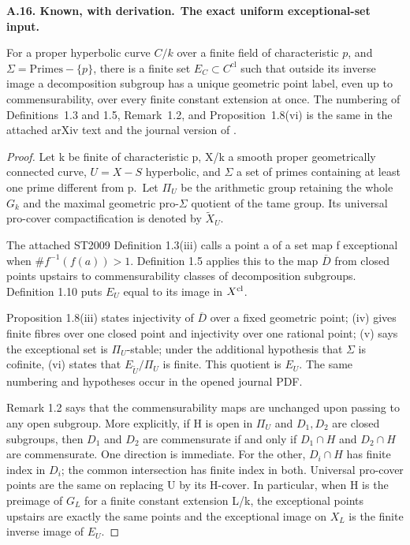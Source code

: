 \documentclass[11pt,a4paper]{article}
\newcommand{\cl}{\mathrm{cl}}
\newenvironment{claim}[3]{\par\medskip\noindent\hypertarget{#1}{\textbf{#1. #2.}}\ \textbf{#3.}\par\nopagebreak\smallskip\begingroup\itshape}{\endgroup\par\smallskip}
\begin{document}
\begin{claim}{A.16}{Known, with derivation}{The exact uniform exceptional-set input}

For a proper hyperbolic curve $C/k$ over a finite field of
characteristic $p$, and $\Sigma=\mathrm{Primes}-\{p\}$, there is a
finite set $E_C\subset C^{\cl}$ such that outside its inverse image
a decomposition subgroup has a unique geometric point label, even
up to commensurability, over every finite constant extension at once.
The numbering of Definitions~1.3 and 1.5, Remark~1.2, and
Proposition~1.8(vi) is the same in the attached arXiv text and the
journal version of \cite{LA_ST2009}.

\end{claim}

\begin{proof}

Let k be finite of characteristic p, X/k a smooth proper geometrically connected curve, \(U=X-S\) hyperbolic, and \({\Sigma}\) a set of primes containing at least one prime different from p.~Let \({\Pi}_U\) be the arithmetic group retaining the whole \(G_k\) and the maximal geometric pro-\({\Sigma}\) quotient of the tame group. Its universal pro-cover compactification is denoted by \(\widetilde X_U\).

The attached ST2009 Definition 1.3(iii) calls a point a of a set map f exceptional when \(\#f^{-1}(f(a))>1\). Definition 1.5 applies this to the map \(\overline D\) from closed points upstairs to commensurability classes of decomposition subgroups. Definition 1.10 puts \(E_U\) equal to its image in \(X^{\rm cl}\).

Proposition 1.8(iii) states injectivity of \(\overline D\) over a fixed geometric point; (iv) gives finite fibres over one closed point and injectivity over one rational point; (v) says the exceptional set is \({\Pi}_U\)-stable; under the additional hypothesis that \({\Sigma}\) is cofinite, (vi) states that \(E_{\widetilde U}/\Pi_U\) is finite. This quotient is \(E_U\). The same numbering and hypotheses occur in the opened journal PDF.

Remark 1.2 says that the commensurability maps are unchanged upon passing to any open subgroup. More explicitly, if H is open in \({\Pi}_U\) and \(D_1,D_2\) are closed subgroups, then \(D_1\) and \(D_2\) are commensurate if and only if \(D_1{\cap}H\) and \(D_2{\cap}H\) are commensurate. One direction is immediate. For the other, \(D_i{\cap}H\) has finite index in \(D_i\); the common intersection has finite index in both. Universal pro-cover points are the same on replacing U by its H-cover. In particular, when H is the preimage of \(G_L\) for a finite constant extension L/k, the exceptional points upstairs are exactly the same points and the exceptional image on \(X_L\) is the finite inverse image of \(E_U\).


\end{proof}
\end{document}
